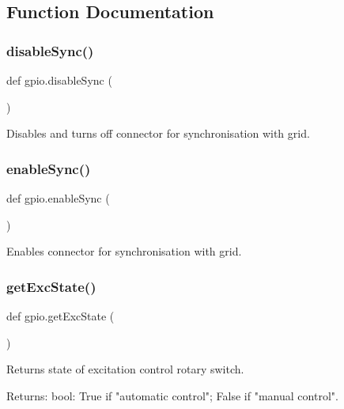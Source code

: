 \subsection{Function Documentation}
\mbox{\label{namespacegpio_ac1912beec6eeee6ca6b0e62d7f80a3a7}} 
\subsubsection{\texorpdfstring{disable\+Sync()}{disableSync()}}
{\footnotesize\ttfamily def gpio.\+disable\+Sync (\begin{DoxyParamCaption}{ }\end{DoxyParamCaption})}

\begin{DoxyVerb}Disables and turns off connector for synchronisation with grid.
\end{DoxyVerb}
 \mbox{\label{namespacegpio_ae8837e6d00fbea19d44f7aa926a634ef}} 
\subsubsection{\texorpdfstring{enable\+Sync()}{enableSync()}}
{\footnotesize\ttfamily def gpio.\+enable\+Sync (\begin{DoxyParamCaption}{ }\end{DoxyParamCaption})}

\begin{DoxyVerb}Enables connector for synchronisation with grid.
\end{DoxyVerb}
 \mbox{\label{namespacegpio_afb4dadb975adb3eee123855ec8703314}} 
\subsubsection{\texorpdfstring{get\+Exc\+State()}{getExcState()}}
{\footnotesize\ttfamily def gpio.\+get\+Exc\+State (\begin{DoxyParamCaption}{ }\end{DoxyParamCaption})}

\begin{DoxyVerb}Returns state of excitation control rotary switch.

Returns:
    bool: True if "automatic control"; False if "manual control".\end{DoxyVerb}
 \mbox{\label{namespacegpio_a8ada6f4c67b4ecad155154eba6f26b91}} 
